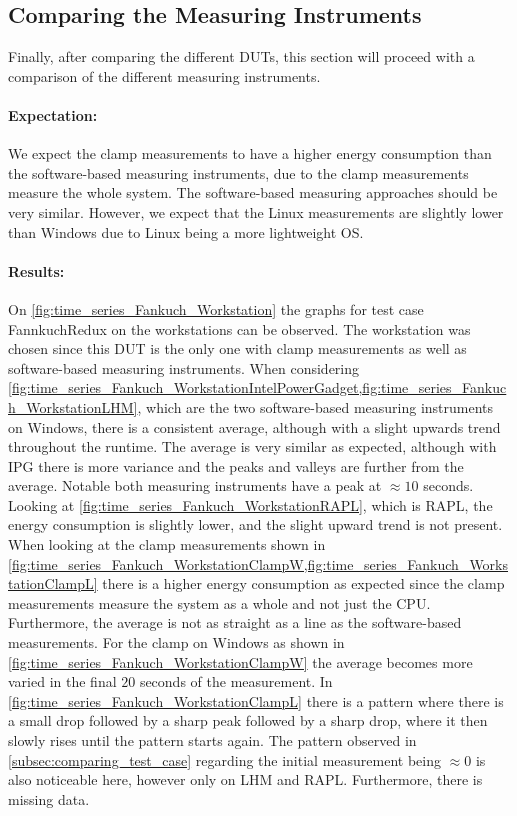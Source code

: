 
\subsection{Comparing the Measuring Instruments}
Finally, after comparing the different DUTs, this section will proceed with a comparison of the different measuring instruments.

\paragraph{Expectation:}
We expect the clamp measurements to have a higher energy consumption than the software-based measuring instruments, due to the clamp measurements measure the whole system. The software-based measuring approaches should be very similar. However, we expect that the Linux measurements are slightly lower than Windows due to Linux being a more lightweight OS.

\paragraph{Results:}
On \cref{fig:time_series_Fankuch_Workstation} the graphs for test case FannkuchRedux on the workstations can be observed. The workstation was chosen since this DUT is the only one with clamp measurements as well as software-based measuring instruments. When considering \cref{fig:time_series_Fankuch_WorkstationIntelPowerGadget,fig:time_series_Fankuch_WorkstationLHM}, which are the two software-based measuring instruments on Windows, there is a consistent average, although with a slight upwards trend throughout the runtime. The average is very similar as expected, although with IPG there is more variance and the peaks and valleys are further from the average. Notable both measuring instruments have a peak at $\approx10$ seconds. Looking at \cref{fig:time_series_Fankuch_WorkstationRAPL}, which is RAPL, the energy consumption is slightly lower, and the slight upward trend is not present. When looking at the clamp measurements shown in \cref{fig:time_series_Fankuch_WorkstationClampW,fig:time_series_Fankuch_WorkstationClampL} there is a higher energy consumption as expected since the clamp measurements measure the system as a whole and not just the CPU. Furthermore, the average is not as straight as a line as the software-based measurements. For the clamp on Windows as shown in \cref{fig:time_series_Fankuch_WorkstationClampW} the average becomes more varied in the final $20$ seconds of the measurement. In \cref{fig:time_series_Fankuch_WorkstationClampL} there is a pattern where there is a small drop followed by a sharp peak followed by a sharp drop, where it then slowly rises until the pattern starts again. The pattern observed in \cref{subsec:comparing_test_case} regarding the initial measurement being $\approx0$ is also noticeable here, however only on LHM and RAPL. Furthermore, there is missing data.

